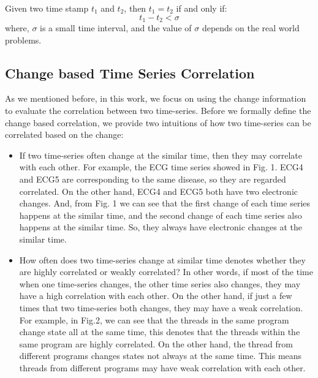 \begin{definition}
	Given two time stamp $t_1$ and $t_2$, then $t_1 = t_2$ if and only if:
	\begin{equation}
	t_1 - t_2 < \sigma
	\end{equation}
	where, $\sigma$ is a small time interval, and the value of $\sigma$ depends on the real world problems.
\end{definition}

\subsection{Change based Time Series Correlation}

As we mentioned before, in this work, we focus on using the change information to evaluate the correlation between two time-series. 
Before we formally define the change based correlation, we provide two intuitions of how two time-series can be correlated based on the change:

\begin{itemize}
	\item If two time-series often change at the similar time, then they may correlate with each other. 
	For example, the ECG time series showed in Fig. 1. 
	ECG4 and ECG5 are corresponding to the same disease, so they are regarded correlated. On the other hand, ECG4 and ECG5 both have two electronic changes. And, from Fig. 1 we can see that the first change of each time series happens at the similar time, and the second change of each time series also happens at the similar time. So, they always have electronic changes at the similar time.
	\item How often does two time-series change at similar time denotes whether they are highly correlated or weakly correlated? In other words, if most of the time when one time-series changes, the other time series also changes, they may have a high correlation with each other. On the other hand, if just a few times that two time-series both changes, they may have a weak correlation.
	For example, in Fig.2, we can see that the threads in the same program change state all at the same time, this denotes that the threads within the same program are highly correlated. On the other hand, the thread from different programs changes states not always at the same time. This means threads from different programs may have weak correlation with each other.
\end{itemize}

